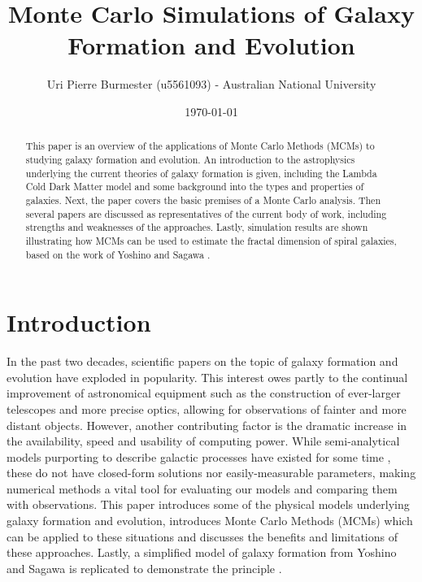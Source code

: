 \documentclass[amsmath,amssymb,reprint,
tightenlines,aps,prl,11pt]{revtex4-1}
\begin{document}
\title[PHYS3103 Essay]{Monte Carlo Simulations of Galaxy Formation and Evolution}%

\author{Uri Pierre Burmester (u5561093) - Australian National University}%

\date{\today}

\begin{abstract}
This paper is an overview of the applications of Monte Carlo Methods (MCMs) to studying galaxy formation and evolution. An introduction to the astrophysics underlying the current theories of galaxy formation is given, including the Lambda Cold Dark Matter model and some background into the types and properties of galaxies. Next, the paper covers the basic premises of a Monte Carlo analysis. Then several papers are discussed as representatives of  the current body of work, including strengths and weaknesses of the approaches. Lastly, simulation results are shown illustrating how MCMs can be used to estimate the fractal dimension of spiral galaxies, based on the work of Yoshino and Sagawa \cite{yoshinoMONTECARLOSIMULATION2008}.
\end{abstract}

\maketitle

\section{Introduction \label{sec:introduction}}

In the past two decades, scientific papers on the topic of galaxy formation and evolution have exploded in popularity. This interest owes partly to the continual improvement of astronomical equipment such as the construction of ever-larger telescopes and more precise optics, allowing for observations of fainter and more distant objects. However, another contributing factor is the dramatic increase in the availability, speed and usability of computing power. While semi-analytical models purporting to describe galactic processes have existed for some time \cite{silkCosmicBlackBodyRadiation1968, peeblesBlackBodyRadiationContent1965}, these do not have closed-form solutions nor easily-measurable parameters, making numerical methods a vital tool for evaluating our models and comparing them with observations. This paper introduces some of the physical models underlying galaxy formation and evolution, introduces Monte Carlo Methods (MCMs) which can be applied to these situations and discusses the benefits and limitations of these approaches. Lastly, a simplified model of galaxy formation from Yoshino and Sagawa is replicated to demonstrate the principle \cite{yoshinoMONTECARLOSIMULATION2008}.
\end{document}
